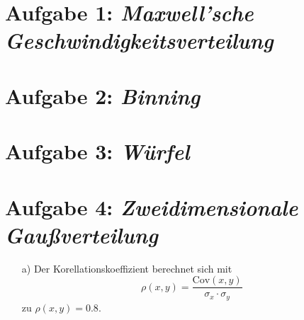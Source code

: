  
\section*{Aufgabe 1: \emph{Maxwell'sche Geschwindigkeitsverteilung}}


\section*{Aufgabe 2: \emph{Binning}}


\section*{Aufgabe 3: \emph{Würfel}}


\section*{Aufgabe 4: \emph{Zweidimensionale Gaußverteilung}}

\begin{itemize}
\item[a)] Der Korellationskoeffizient berechnet sich mit
\begin{equation}
\rho(x,y)=\frac{\text{Cov}(x,y)}{\sigma_x\cdot\sigma_y}
\end{equation}
zu $\rho(x,y)=0.8.$


\end{itemize}

